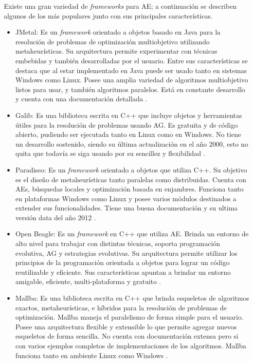 Existe una gran variedad de \emph{frameworks} para AE; a continuación se describen algunos de los más populares junto con sus principales características.

\begin{itemize}
	\item JMetal: Es un \emph{framework} orientado a objetos basado en Java para la resolución de problemas de optimización multiobjetivo utilizando metaheurísticas. Su arquitectura permite experimentar con técnicas embebidas y también desarrolladas por el usuario. Entre sus características se destaca que al estar implementado en Java puede ser usado tanto en sistemas Windows como Linux. Posee una amplia variedad de algoritmos multiobjetivo listos para usar, y también algoritmos paralelos. Está en constante desarrollo y cuenta con una documentación detallada \citep{Jmetal}.
	
	\item Galib: Es una biblioteca escrita en C++ que incluye objetos y herramientas útiles para la resolución de problemas usando AG. Es gratuita y de código abierto, pudiendo ser ejecutada tanto en Linux como en Windows. No tiene un desarrollo sostenido, siendo su última actualización en el año 2000, esto no quita que todavía se siga usando por su sencillez y flexibilidad \citep{Galib}.
	
	\item Paradiseo: Es un \emph{framework} orientado a objetos que utiliza C++. Su objetivo es el diseño de metaheurísticas tanto paralelas como distribuidas. Cuenta con AEs, búsquedas locales y optimización basada en enjambres. Funciona tanto en plataformas Windows como Linux y posee varios módulos destinados a extender sus funcionalidades. Tiene una buena documentación y su ultima versión data del año 2012 \citep{Paradiseo}.
	
	\item Open Beagle: Es un \emph{framework} en C++ que utiliza AE. Brinda un entorno de alto nivel para trabajar con distintas técnicas, soporta programación evolutiva, AG y estrategias evolutivas. Su arquitectura permite utilizar los principios de la programación orientada a objetos para lograr un código reutilizable y eficiente. Sus características apuntan a brindar un entorno amigable, eficiente, multi-plataforma y gratuito \citep{OpenBeagle}.
	
	\item Mallba: Es una biblioteca escrita en C++ que brinda esqueletos de algoritmos exactos, metaheurísticas, e híbridos para la resolución de problemas de optimización. Mallba maneja el paralelismo de forma simple para el usuario. Posee una arquitectura flexible y extensible lo que permite agregar nuevos esqueletos de forma sencilla. No cuenta con documentación extensa pero si con varios ejemplos completos de implementaciones de los algoritmos. Mallba funciona tanto en ambiente Linux como Windows \citep{Mallba}.
	

\end{itemize}

